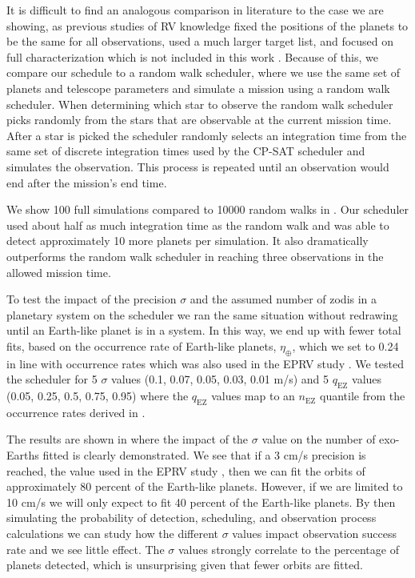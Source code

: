 It is difficult to find
an analogous comparison in literature to the case we are showing, as previous
studies of RV knowledge fixed the positions of the planets to be the same for
all observations, used a much larger target list, and focused on full
characterization which is not included in this work
\citep{morganExplorationExpectedNumber2022a}. Because of this, we compare our
schedule to a random walk scheduler, where we use the same set of planets and
telescope parameters and simulate a mission using a random walk scheduler. When
determining which star to observe the random walk scheduler picks randomly from
the stars that are observable at the current mission time. After a star is
picked the scheduler randomly selects an integration time from the same set of
discrete integration times used by the CP-SAT scheduler and simulates the
observation. This process is repeated until an observation would end after the
mission's end time.

We show 100 full simulations compared to 10000 random walks in 
. Our scheduler used about half as much integration
time as the random walk and was able to detect approximately 10 more planets
per simulation. It also dramatically outperforms the random walk scheduler
in reaching three observations in the allowed mission time.

To test the impact of the precision $\sigma$ and the assumed number of zodis in
a planetary system on the scheduler we ran the same situation without redrawing
until an Earth-like planet is in a system. In this way, we end up with fewer
total fits, based on the occurrence rate of Earth-like planets,
$\eta_{\oplus}$, which we set to 0.24 in line with
\citet{dulzJointRadialVelocity2020} occurrence rates which was also used in the
EPRV study \citep{morganExplorationExpectedNumber2022a}. We tested the
scheduler for 5 $\sigma$ values (0.1, 0.07, 0.05, 0.03, 0.01 m/s) and 5
$q_\textrm{EZ}$ values (0.05, 0.25, 0.5, 0.75, 0.95) where the $q_\textrm{EZ}$
values map to an $n_\textrm{EZ}$ quantile from the occurrence rates derived
in \citet{ertelHOSTSSurvey2020}.

The results are shown in  where the impact of
the $\sigma$ value on the number of exo-Earths fitted is clearly demonstrated.
We see that if a 3 cm/s precision is reached, the value used in the EPRV study
\citet{morganExplorationExpectedNumber2022a}, then we can fit the orbits of
approximately 80 percent of the Earth-like planets. However, if we are limited
to 10 cm/s we will only expect to fit 40 percent of the Earth-like planets. By
then simulating the probability of detection, scheduling, and observation
process calculations we can study how the different $\sigma$ values impact
observation success rate and we see little effect. The $\sigma$ values strongly
correlate to the percentage of planets detected, which is unsurprising given
that fewer orbits are fitted.

